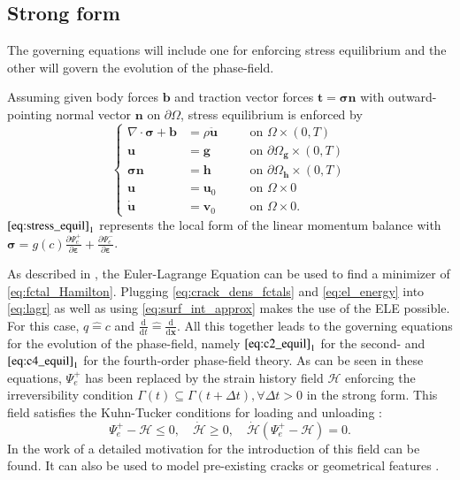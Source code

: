 \subsection{Strong form} \label{sec:strong_form}
The governing equations will include one for enforcing stress equilibrium and the other will govern the evolution of the phase-field.

Assuming given body forces $\mathbf{b}$ and traction vector forces $\mathbf{t}=\bm{\sigma}\mathbf{n}$ with outward-pointing normal vector $\mathbf{n}$ on $\partial\Omega$, stress equilibrium is enforced by
\begin{equation} \label{eq:stress_equil}
	 \left\{\begin{alignedat}{2}
\nabla\cdot\bm{\sigma}+\mathbf{b} &= \rho\ddot{\mathbf{u}} && \quad\text{on } \Omega\times\left(0,T\right) \\
		\mathbf{u} &= \mathbf{g} && \quad\text{on } \partial\Omega_{\mathbf{g}}\times\left(0,T\right) \\
		\bm{\sigma}\mathbf{n} &= \mathbf{h} && \quad\text{on } \partial\Omega_{\mathbf{h}}\times\left(0,T\right) \\
		\mathbf{u} &= \mathbf{u}_{0} && \quad\text{on } \Omega\times0 \\
		\dot{\mathbf{u}} &= \mathbf{v}_{0} && \quad\text{on } \Omega\times0.
  \end{alignedat}\right.
\end{equation}
$\eqref{eq:stress_equil}_{1}$ represents the local form of the linear momentum balance with $\bm{\sigma}=g\left(c\right)\frac{\partial\Psi_{e}^{+}}{\partial\bm{\varepsilon}}+\frac{\partial\Psi_{e}^{-}}{\partial\bm{\varepsilon}}$.

As described in , the Euler-Lagrange Equation can be used to find a minimizer of \eqref{eq:fctal_Hamilton}. Plugging \eqref{eq:crack_dens_fctals} and \eqref{eq:el_energy} into \eqref{eq:lagr} as well as using \eqref{eq:surf_int_approx} makes the use of the ELE possible. For this case, $q\hat{=}c$ and $\frac{\mathrm{d}}{\mathrm{d}t}\hat{=}\frac{\mathrm{d}}{\mathrm{d}\mathbf{x}}$. All this together leads to the governing equations for the evolution of the phase-field, namely $\eqref{eq:c2_equil}_{1}$ for the second- and $\eqref{eq:c4_equil}_{1}$ for the fourth-order phase-field theory. As can be seen in these equations, $\Psi_{e}^{+}$ has been replaced by the strain history field $\mathcal{H}$ enforcing the irreversibility condition $\Gamma\left(t\right)\subseteq\Gamma\left(t+\Delta t\right), \forall \Delta t>0$ in the strong form. This field satisfies the Kuhn-Tucker conditions for loading and unloading \cite{01_PF_dyn_brittle}:
\begin{equation} \label{eq:KuhnTucker}
	\Psi_{e}^{+}-\mathcal{H}\leq0, \quad \dot{\mathcal{H}}\geq0, \quad \dot{\mathcal{H}}\left(\Psi_{e}^{+}-\mathcal{H}\right)=0.
\end{equation}
In the work of \citet{04_B_VarBrittleProve2} a detailed motivation for the introduction of this field can be found. It can also be used to model pre-existing cracks or geometrical features \cite{01_PF_dyn_brittle}.

